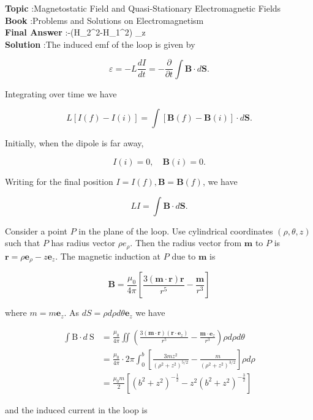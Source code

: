 \documentclass[10pt]{article}
\begin{document}
\textbf{Topic} :Magnetostatic Field and Quasi-Stationary Electromagnetic Fields\\
\textbf{Book} :Problems and Solutions on Electromagnetism\\
\textbf{Final Answer} :-\left(H_{2}^{2}-H_{1}^{2}\right) _{z}\\


\textbf{Solution} :The induced emf of the loop is given by

$$
\varepsilon=-L \frac{d I}{d t}=-\frac{\partial}{\partial t} \int \mathbf{B} \cdot d \mathbf{S} .
$$

Integrating over time we have

$$
L[I(f)-I(i)]=\int[\mathbf{B}(f)-\mathbf{B}(i)] \cdot d \mathbf{S} .
$$

Initially, when the dipole is far away,

$$
I(i)=0, \quad \mathbf{B}(i)=0 .
$$

Writing for the final position $I=I(f), \mathbf{B}=\mathbf{B}(f)$, we have

$$
L I=\int \mathbf{B} \cdot d \mathbf{S} .
$$

Consider a point $P$ in the plane of the loop. Use cylindrical coordinates $(\rho, \theta, z)$ such that $P$ has radius vector $\rho e_{\rho}$. Then the radius vector from $\mathbf{m}$ to $P$ is $\mathbf{r}=\rho \mathbf{e}_{\rho}-z \mathbf{e}_{z}$. The magnetic induction at $P$ due to $\mathbf{m}$ is

$$
\mathbf{B}=\frac{\mu_{0}}{4 \pi}\left[\frac{3(\mathbf{m} \cdot \mathbf{r}) \mathbf{r}}{r^{5}}-\frac{\mathbf{m}}{r^{3}}\right]
$$

where $m=m \mathbf{e}_{z}$. As $d S=\rho d \rho d \theta \mathbf{e}_{z}$ we have

$$
\begin{aligned}
\int \mathrm{B} \cdot d \mathrm{~S} &=\frac{\mu_{0}}{4 \pi} \iint\left(\frac{3(\mathbf{m} \cdot \mathbf{r})\left(\mathbf{r} \cdot \mathbf{e}_{z}\right)}{r^{5}}-\frac{\mathbf{m} \cdot \mathbf{e}_{z}}{r^{3}}\right) \rho d \rho d \theta \\
&=\frac{\mu_{0}}{4 \pi} \cdot 2 \pi \int_{0}^{b}\left[\frac{3 m z^{2}}{\left(\rho^{2}+z^{2}\right)^{5 / 2}}-\frac{m}{\left(\rho^{2}+z^{2}\right)^{3 / 2}}\right] \rho d \rho \\
&=\frac{\mu_{0} m}{2}\left[\left(b^{2}+z^{2}\right)^{-\frac{1}{2}}-z^{2}\left(b^{2}+z^{2}\right)^{-\frac{3}{2}}\right]
\end{aligned}
$$

and the induced current in the loop is
\end{document}
